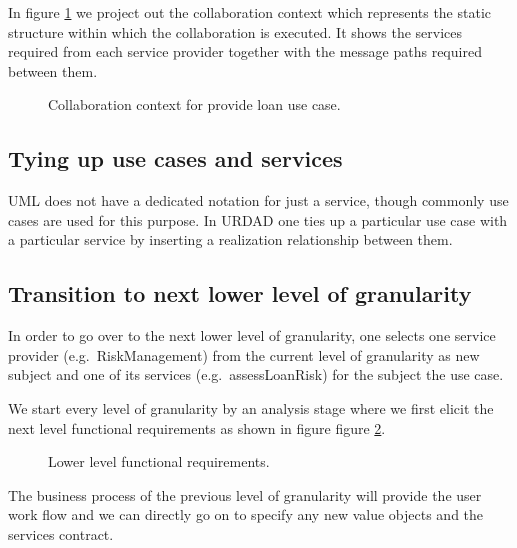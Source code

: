 \documentclass{IOS-Book-Article}
\begin{document}
In figure \ref{fig:provideLoanCollaborationContext} we project out the collaboration context
which represents the static structure within
which the collaboration is executed. It shows the services required from each service
provider together with the message paths required between them.

\begin{figure}
  \centering
  \caption{Collaboration context for provide loan use case.}
  \label{fig:provideLoanCollaborationContext}
\end{figure}



\subsection{Tying up use cases and services}

UML does not have a dedicated notation for just a service, though commonly
use cases are used for this purpose. In URDAD one ties up a particular use case
with a particular service by inserting a realization relationship between them.


\subsection{Transition to next lower level of granularity}

In order to go over to the next lower level of granularity, one selects one
service provider (e.g.\ RiskManagement) from the current level of granularity as new
subject and one of its services (e.g.\ assessLoanRisk) for the subject the use case.

We start every level of granularity by an analysis stage where we first elicit the next level functional requirements as shown in figure figure \ref{fig:assessLoanRiskFunctionalRequirements}.

\begin{figure}
  \centering
  \caption{Lower level functional requirements.}
  \label{fig:assessLoanRiskFunctionalRequirements}
\end{figure}

The business process of the previous level of granularity will provide
the user work flow and we can directly go on to specify any new value objects
and the services contract.
\end{document}
